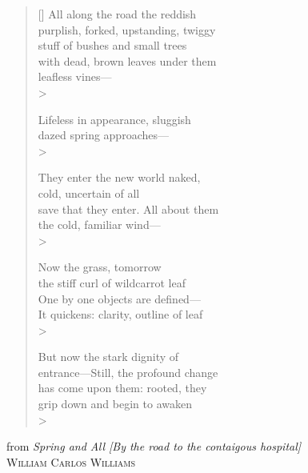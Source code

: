 \begin{vplace}
\settowidth{\versewidth}{It quickens: clarity, outline of leaf}
\begin{verse}[\versewidth]
    All along the road the reddish\\
    purplish, forked, upstanding, twiggy\\
    stuff of bushes and small trees\\
    with dead, brown leaves under them\\
    leafless vines—\\>
    
    Lifeless in appearance, sluggish\\
    dazed spring approaches—\\>
    
    They enter the new world naked,\\
    cold, uncertain of all\\
    save that they enter. All about them\\
    the cold, familiar wind—\\>
    
    Now the grass, tomorrow\\
    the stiff curl of wildcarrot leaf\\
    One by one objects are defined—\\
    It quickens: clarity, outline of leaf\\>
    
    But now the stark dignity of\\
    entrance—Still, the profound change\\
    has come upon them: rooted, they\\
    grip down and begin to awaken\\>   
\end{verse}
\begin{flushright}
    from \textit{Spring and All [By the road to the contaigous hospital]}\\
    \textsc{William Carlos Williams}
\end{flushright}
\end{vplace}